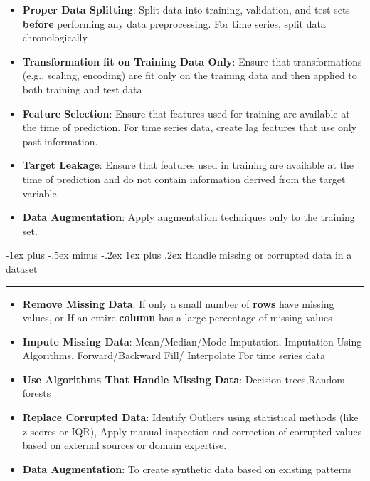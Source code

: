 \documentclass[letterpaper, 10.5pt,landscape]{article}
\makeatletter
\renewcommand{\subsubsection}{\@startsection{subsubsection}{3}{0mm}%
                                {-1ex plus -.5ex minus -.2ex}%
                                {1ex plus .2ex}%
                                {\normalfont\small\bfseries}}
\makeatother
\begin{document}
\begin{multicols*}{3}
\begin{itemize} [leftmargin=0.5cm]
    \item \textbf{Proper Data Splitting}: Split data into training, validation, and test sets \textbf{before} performing any data preprocessing. For time series, split data chronologically.
    \vspace{-3pt}
    \item \textbf{Transformation fit on Training Data Only}: Ensure that transformations (e.g., scaling, encoding) are fit only on the training data and then applied to both training and test data
    \item \textbf{Feature Selection}: Ensure that features used for training are available at the time of prediction. For time series data, create lag features that use only past information.
    \vspace{-3pt}
    \item \textbf{Target Leakage}: Ensure that features used in training are available at the time of prediction and do not contain information derived from the target variable.
    \vspace{-3pt}
    \item \textbf{Data Augmentation}: Apply augmentation techniques only to the training set. 
\end{itemize}



\subsubsection{Handle missing or corrupted data in a dataset} {\color{teal}\hrule height 0.5pt} \smallskip

\begin{itemize} [leftmargin=0.5cm]
    \item \textbf{Remove Missing Data}: If only a small number of \textbf{rows} have missing values, or If an entire \textbf{column} has a large percentage of missing values
    \vspace{-3pt}
    \item \textbf{Impute Missing Data}: Mean/Median/Mode Imputation, Imputation Using Algorithms, Forward/Backward Fill/ Interpolate For time series data
    \item \textbf{Use Algorithms That Handle Missing Data}: Decision trees,Random forests
    \vspace{-3pt}
    \item \textbf{Replace Corrupted Data}: Identify Outliers using statistical methods (like z-scores or IQR), Apply manual inspection and correction of corrupted values based on external sources or domain expertise.
    \vspace{-3pt}
    \item \textbf{Data Augmentation}: To create synthetic data based on existing patterns
\end{itemize}



\end{multicols*}
\end{document}
